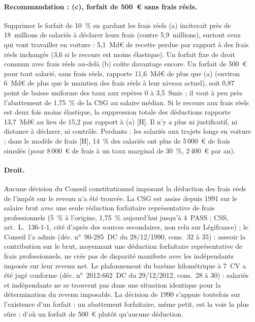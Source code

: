\paragraph{Recommandation : (c), forfait de 500~€ sans frais réels.} Supprimer le forfait de 10~\% en gardant les frais réels (a) inciterait près de 18~millions de salariés à déclarer leurs frais (contre 5,9~millions), surtout ceux qui vont travailler en voiture : 5,1~Md€ de recette perdue par rapport à des frais réels inchangés (3,6 si le recours est moins élastique). Un forfait fixe de droit commun avec frais réels au-delà (b) coûte davantage encore. Un forfait de 500~€ pour tout salarié, sans frais réels, rapporte 11,6~Md€ de plus que (a) (environ 6~Md€ de plus que le maintien des frais réels à leur niveau actuel), soit 0,87 point de baisse uniforme des taux aux repères 0 à 3,5~Smic ; il vaut à peu près l'abattement de 1,75~\% de la CSG au salaire médian. Si le recours aux frais réels est deux fois moins élastique, la suppression totale des déductions rapporte 13,7~Md€ au lieu de 15,2 par rapport à (a) [H]. Il n'y a plus ni justificatif, ni distance à déclarer, ni contrôle. Perdants : les salariés aux trajets longs en voiture ; dans le modèle de frais [H], 14~\% des salariés ont plus de 5\,000~€ de frais simulés (pour 8\,000~€ de frais à un taux marginal de 30~\%, 2\,400~€ par an).

\paragraph{Droit.} Aucune décision du Conseil constitutionnel imposant la déduction des frais réels de l'impôt sur le revenu n'a été trouvée. La CSG est assise depuis 1991 sur le salaire brut avec une seule réduction forfaitaire représentative de frais professionnels (5~\% à l'origine, 1,75~\% aujourd'hui jusqu'à 4~PASS ; CSS, art.~L.~136-1-1, cité d'après des sources secondaires, non relu sur Légifrance) ; le Conseil l'a admis (déc. n°~90-285~DC du 28/12/1990, cons.~32 à 35) : asseoir la contribution sur le brut, moyennant une déduction forfaitaire représentative de frais professionnels, ne crée pas de disparité manifeste avec les indépendants imposés sur leur revenu net. Le plafonnement du barème kilométrique à 7~CV a été jugé conforme (déc. n°~2012-662~DC du 29/12/2012, cons.~28 à 30) : salariés et indépendants ne se trouvent pas dans une situation identique pour la détermination du revenu imposable. La décision de 1990 s'appuie toutefois sur l'existence d'un forfait : un abattement forfaitaire, même petit, est la voie la plus sûre ; d'où un forfait de 500~€ plutôt qu'aucune déduction.

